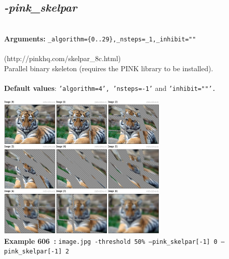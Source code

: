 \documentclass[a4paper,11pt,twoside]{book}
\begin{document}
\subsection{\emph{-pink\_skelpar} }\vspace*{-0.5em}
~\\\textbf{Arguments: } 
{\small \texttt{\_algorithm=\{0..29\},\_nsteps=\_1,\_inhibit=""}}\\~\\
(http://pinkhq.com/skelpar\_8c.html)
~\\Parallel binary skeleton (requires the PINK library to be installed).
~\\~\\\textbf{Default values}: {\small \texttt{'algorithm=4', 'nsteps=-1'} and \texttt{'inhibit=""'.}}
\begin{center}\includegraphics[keepaspectratio=true,height=7cm,width=\textwidth]{img/gmic_def606.jpg}\\
{\footnotesize \textbf{Example 606~:} \texttt{image.jpg -threshold 50\% --pink\_skelpar[-1] 0 --pink\_skelpar[-1] 2}}
\end{center}
\end{document}
